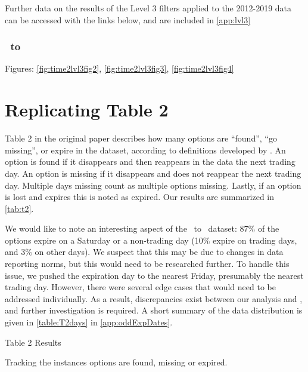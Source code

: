 \clearpage

Further data on the results of the Level 3 filters applied to the 2012-2019 data can be accessed with the links below, and are included in \autoref{app:lvl3}

\subsubsection{\STARTTWO\ to \ENDTWO }
Figures: \autoref{fig:time2lvl3fig2}, \autoref{fig:time2lvl3fig3}, \autoref{fig:time2lvl3fig4}


\clearpage

\section{Replicating Table 2}
Table 2 in the original paper describes how many options are ``found'', ``go missing'', or expire in the dataset, according to definitions developed by \citet{constantinides2013}. An option is found if it disappears and then reappears in the data the next trading day. An option is missing if it disappears and does not reappear the next trading day. Multiple days missing count as multiple options missing. Lastly, if an option is lost and expires this is noted as expired. Our results are summarized in \autoref{tab:t2}.

We would like to note an interesting aspect of the \STARTONE\ to \ENDONE\ dataset: 87\% of the options expire on a Saturday or a non-trading day (10\% expire on trading days, and 3\% on other days). We suspect that this may be due to changes in data reporting norms, but this would need to be researched further. To handle this issue, we pushed the expiration day to the nearest Friday, presumably the nearest trading day. However, there were several edge cases that would need to be addressed individually. As a result, discrepancies exist between our analysis and \citet{constantinides2013}, and further investigation is required. A short summary of the data distribution is given in \autoref{table:T2days} in \autoref{app:oddExpDates}. 

\newpage

\thispagestyle{empty}
\begin{landscape}

\begin{table}
   \centering
   \caption{Table 2 Results}    
  \resizebox{1.4\textwidth}{!}{
  \hspace*{-4cm}
    
    }
  \caption*{Tracking the instances options are found, missing or expired.}
\label{tab:t2}
\end{table}
\vfill
\raisebox{-6.5cm}{\makebox[\linewidth]{\thepage}}
\end{landscape}



